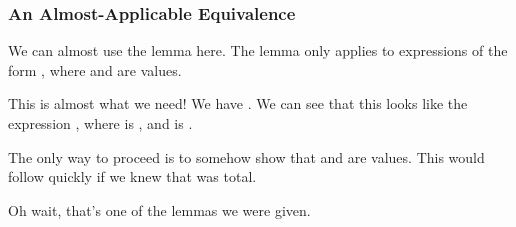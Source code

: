 \documentclass[aspectratio=169]{beamer}
\begin{document}
\begin{frame}[fragile]
  \frametitle{An Almost-Applicable Equivalence}

  We can almost use the lemma here. The lemma only applies to expressions of
  the form , where  and  are values.

  \pause
  \vspace{\fill}

  This is almost what we need! We have .
  We can see that this looks like the expression , where
   is , and  is .

  \pause
  \vspace{\fill}

  The only way to proceed is to somehow show that  and 
  are values. This would follow quickly if we knew that  was total.

  \pause
  \vspace{\fill}

  Oh wait, that's one of the lemmas we were given.
\end{frame}
\end{document}
